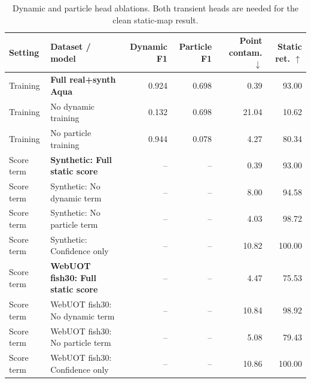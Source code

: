 \begin{table}[t]
\centering
\small
\caption{Dynamic and particle head ablations. Both transient heads are needed for the clean static-map result.}
\label{tab:aqua_head_ablation}
\begin{tabular}{llrrrr}
\toprule
Setting & Dataset / model & Dynamic F1 & Particle F1 & Point contam. $\downarrow$ & Static ret. $\uparrow$ \\
\midrule
Training & \textbf{Full real+synth Aqua} & 0.924 & 0.698 & 0.39 & 93.00 \\
Training & No dynamic training & 0.132 & 0.698 & 21.04 & 10.62 \\
Training & No particle training & 0.944 & 0.078 & 4.27 & 80.34 \\
Score term & \textbf{Synthetic: Full static score} & -- & -- & 0.39 & 93.00 \\
Score term & Synthetic: No dynamic term & -- & -- & 8.00 & 94.58 \\
Score term & Synthetic: No particle term & -- & -- & 4.03 & 98.72 \\
Score term & Synthetic: Confidence only & -- & -- & 10.82 & 100.00 \\
Score term & \textbf{WebUOT fish30: Full static score} & -- & -- & 4.47 & 75.53 \\
Score term & WebUOT fish30: No dynamic term & -- & -- & 10.84 & 98.92 \\
Score term & WebUOT fish30: No particle term & -- & -- & 5.08 & 79.43 \\
Score term & WebUOT fish30: Confidence only & -- & -- & 10.86 & 100.00 \\
\bottomrule
\end{tabular}
\end{table}
